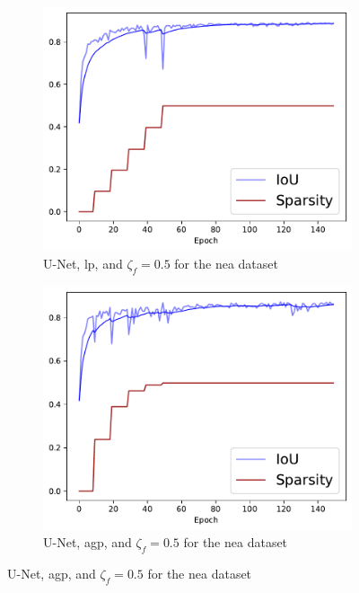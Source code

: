 \documentclass[mathematics,article,submit,pdftex,moreauthors]{Definitions/mdpi}
\begin{document}
\begin{figure}[!ht]
    \centering
      \begin{subfigure}[t]{.29\textwidth}
        \centering
        \includegraphics[width=.95\linewidth]{figures/pruning/unet_linear_0.5_NEAtraining_progress.pdf}
        \caption{U-Net, \ac{lp}, and $\zeta_f=0.5$ for the \ac{nea} dataset}
        \label{fig:results:pruning:iou:unet-lp-0.5-nea}
      \end{subfigure}
      \hfill
      \begin{subfigure}[t]{.29\textwidth}
        \centering
        \includegraphics[width=.95\linewidth]{figures/pruning/unet_agp_0.5_NEAtraining_progress.pdf}
        \caption{U-Net, \ac{agp}, and $\zeta_f=0.5$ for the \ac{nea} dataset}

\end{subfigure}
\end{figure}
\end{document}
